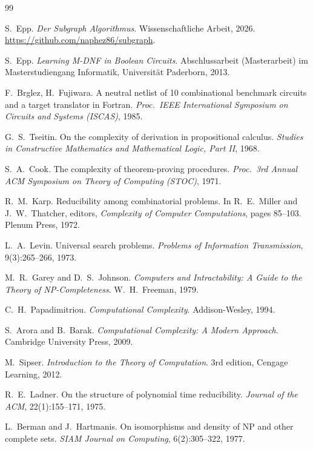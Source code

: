\documentclass[a4paper,12pt]{article}
\theoremstyle{definition}
\begin{document}
\begin{thebibliography}{99}

S.~Epp. \emph{Der Subgraph Algorithmus}. Wissenschaftliche Arbeit, 2026. \url{https://github.com/naphez86/subgraph}.

S.~Epp. \emph{Learning M-DNF in Boolean Circuits}. Abschlussarbeit (Masterarbeit) im Masterstudiengang Informatik, Universität Paderborn, 2013.

F.~Brglez, H.~Fujiwara. A neutral netlist of 10 combinational benchmark circuits and a target translator in Fortran. \emph{Proc.\ IEEE International Symposium on Circuits and Systems (ISCAS)}, 1985.

G.~S.~Tseitin. On the complexity of derivation in propositional calculus. \emph{Studies in Constructive Mathematics and Mathematical Logic, Part II}, 1968.

S.~A.~Cook. The complexity of theorem-proving procedures. \emph{Proc.\ 3rd Annual ACM Symposium on Theory of Computing (STOC)}, 1971.

R.~M.~Karp. Reducibility among combinatorial problems. In R.~E.~Miller and J.~W.~Thatcher, editors, \emph{Complexity of Computer Computations}, pages 85--103. Plenum Press, 1972.

L.~A.~Levin. Universal search problems. \emph{Problems of Information Transmission}, 9(3):265--266, 1973.

M.~R.~Garey and D.~S.~Johnson. \emph{Computers and Intractability: A Guide to the Theory of NP-Completeness}. W.~H.~Freeman, 1979.

C.~H.~Papadimitriou. \emph{Computational Complexity}. Addison-Wesley, 1994.

S.~Arora and B.~Barak. \emph{Computational Complexity: A Modern Approach}. Cambridge University Press, 2009.

M.~Sipser. \emph{Introduction to the Theory of Computation}. 3rd edition, Cengage Learning, 2012.

R.~E.~Ladner. On the structure of polynomial time reducibility. \emph{Journal of the ACM}, 22(1):155--171, 1975.

L.~Berman and J.~Hartmanis. On isomorphisms and density of NP and other complete sets. \emph{SIAM Journal on Computing}, 6(2):305--322, 1977.


\end{thebibliography}
\end{document}
